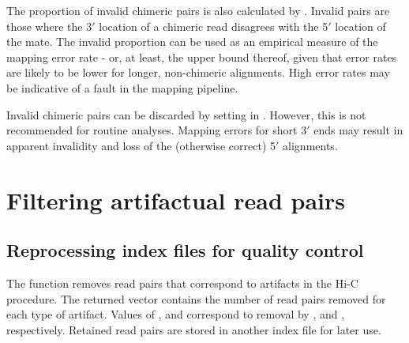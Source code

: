 \documentclass{report}\usepackage[]{graphicx}\usepackage[usenames,dvipsnames]{color}
\newcommand{\hlstr}[1]{\textcolor[rgb]{0.251,0.627,0.251}{#1}}%
\newcommand{\hlopt}[1]{\textcolor[rgb]{0,0,0}{#1}}%
\newcommand{\hlstd}[1]{\textcolor[rgb]{0.251,0.251,0.251}{#1}}%
\newenvironment{knitrout}{}{} %
\begin{document}
The proportion of invalid chimeric pairs is also calculated by .
Invalid pairs are those where the 3$'$ location of a chimeric read disagrees with the 5$'$ location of the mate.
The invalid proportion can be used as an empirical measure of the mapping error rate - or, at least, the upper bound thereof, given that error rates are likely to be lower for longer, non-chimeric alignments.
High error rates may be indicative of a fault in the mapping pipeline.

\begin{knitrout}
\color{fgcolor}
\end{knitrout}

Invalid chimeric pairs can be discarded by setting  in .
However, this is not recommended for routine analyses.
Mapping errors for short 3$'$ ends may result in apparent invalidity and loss of the (otherwise correct) 5$'$ alignments.

\section{Filtering artifactual read pairs}

\subsection{Reprocessing index files for quality control}
The  function removes read pairs that correspond to artifacts in the Hi-C procedure.
The returned vector contains the number of read pairs removed for each type of artifact.
Values of ,  and  correspond to removal by ,  and , respectively.
Retained read pairs are stored in another index file for later use.
\end{document}
